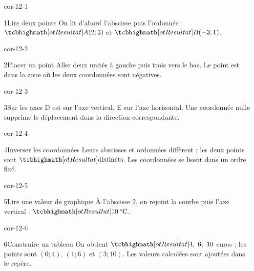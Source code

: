 \clearpage\pagestyle{otMain}\setlength{\otBlocEspacement}{2.5mm}\fontsize{11}{15}\selectfont{}
\begin{blocLivre}{cor-12-1}\begin{corrige}{1}{Lire deux points}
On lit d’abord l’abscisse puis l’ordonnée : $\res{A(2;3)}$ et $\res{B(-3;1)}$.
\label{fig-cor-12-1}
\end{corrige}\end{blocLivre}
\begin{blocLivre}{cor-12-2}\begin{corrige}{2}{Placer un point}
Aller deux unités à gauche puis trois vers le bas. Le point est dans la zone où les deux coordonnées sont négatives.
\label{fig-cor-12-2}
\end{corrige}\end{blocLivre}
\begin{blocLivre}{cor-12-3}\begin{corrige}{3}{Sur les axes}
D est sur l’axe vertical, E sur l’axe horizontal. Une coordonnée nulle supprime le déplacement dans la direction correspondante.
\label{fig-cor-12-3}
\end{corrige}\end{blocLivre}
\begin{blocLivre}{cor-12-4}\begin{corrige}{4}{Inverser les coordonnées}
Leurs abscisses et ordonnées diffèrent ; les deux points sont $\res{\text{distincts}}$. Les coordonnées se lisent dans un ordre fixé.
\label{fig-cor-12-4}
\end{corrige}\end{blocLivre}
\begin{blocLivre}{cor-12-5}\begin{corrige}{5}{Lire une valeur de graphique}
À l’abscisse 2, on rejoint la courbe puis l’axe vertical : $\res{10\,^\circ\mathrm C}$.
\label{fig-cor-12-5}
\end{corrige}\end{blocLivre}
\begin{blocLivre}{cor-12-6}\begin{corrige}{6}{Construire un tableau}
On obtient $\res{4,\ 6,\ 10}$ euros ; les points sont $(0;4)$, $(1;6)$ et $(3;10)$. Les valeurs calculées sont ajoutées dans le repère.
\label{fig-cor-12-6}
\end{corrige}\end{blocLivre}
